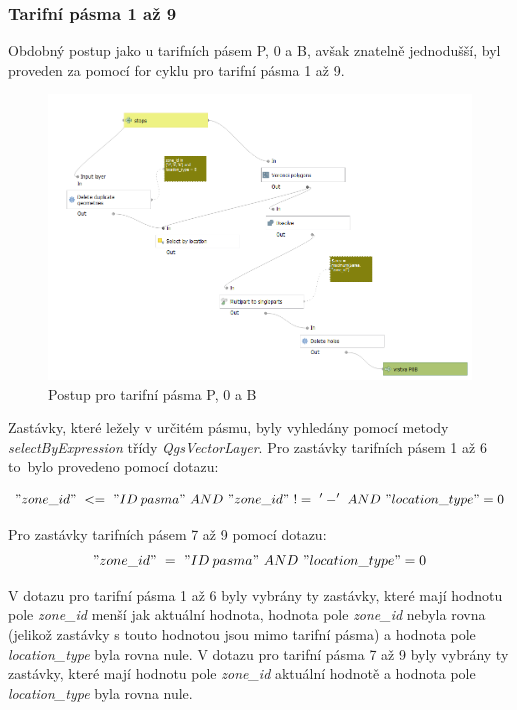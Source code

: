\subsubsection{Tarifní pásma 1 až 9}
\label{tp_1az9}

Obdobný postup jako u tarifních pásem P, 0 a B, avšak znatelně jednodušší, byl proveden za pomocí
for cyklu pro tarifní pásma 1 až 9.

\begin{figure}[H] \centering
    \includegraphics[width=400pt]{./pictures/postup-voronoi-P0B.png}
    \caption[Postup pro tarifní pásma P, 0 a B]{Postup pro tarifní pásma P, 0 a B}
	\label{fig:postup-voronoi-P0B}              
\end{figure}

Zastávky, které ležely v určitém pásmu, byly vyhledány pomocí metody \textit{selectByExpression} třídy 
\textit{QgsVectorLayer}. Pro zastávky tarifních pásem 1 až 6 to~bylo provedeno pomocí dotazu:

\["zone\_id"\ <=\ "ID\: pasma"\ AND\ "zone\_id"\ !=\ '-'\ AND\ "location\_type" = 0\]  

Pro zastávky tarifních pásem 7 až 9 pomocí dotazu:
\["zone\_id"\ =\ "ID\: pasma"\ AND\ "location\_type" = 0\] 

V dotazu pro tarifní pásma 1 až 6 byly vybrány ty zastávky, které mají hodnotu pole \textit{zone\_id} menší jak aktuální hodnota,
hodnota pole \textit{zone\_id} nebyla rovna  (jelikož zastávky s touto hodnotou jsou mimo tarifní pásma)
a hodnota pole \textit{location\_type} byla rovna nule. V dotazu pro tarifní pásma 7 až 9 byly vybrány ty zastávky,
které mají hodnotu pole \textit{zone\_id} aktuální hodnotě a hodnota pole \textit{location\_type} byla rovna nule.


